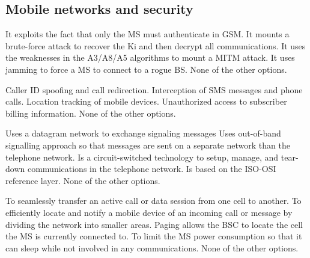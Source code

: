 \subsection{Mobile networks and security}

\begin{checkboxes}
    \CorrectChoice It exploits the fact that only the MS must authenticate in GSM.
    \choice It mounts a brute-force attack to recover the Ki and then decrypt all communications.
    \choice It uses the weaknesses in the A3/A8/A5 algorithms to mount a MITM attack.
    \choice It uses jamming to force a MS to connect to a rogue BS.
    \choice None of the other options.
\end{checkboxes}


\begin{checkboxes}
    \CorrectChoice Caller ID spoofing and call redirection.
    \CorrectChoice Interception of SMS messages and phone calls.
    \CorrectChoice Location tracking of mobile devices.
    \choice Unauthorized access to subscriber billing information.
    \choice None of the other options.
\end{checkboxes}

\begin{checkboxes}
    \CorrectChoice Uses a datagram network to exchange signaling messages
    \CorrectChoice Uses out-of-band signalling approach so that messages are sent on a separate network than the telephone network.
    \choice Is a circuit-switched technology to setup, manage, and tear-down communications in the telephone network.
    \choice Is based on the ISO-OSI reference layer.
    \choice None of the other options.
\end{checkboxes}

\begin{checkboxes}
    \choice To seamlessly transfer an active call or data session from one cell to another.
    \CorrectChoice To efficiently locate and notify a mobile device of an incoming call or message by dividing the network into smaller areas.
    \CorrectChoice Paging allows the BSC to locate the cell the MS is currently connected to.
    \choice To limit the MS power consumption so that it can sleep while not involved in any communications.
    \choice None of the other options.
\end{checkboxes}

